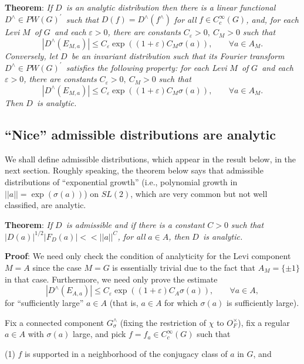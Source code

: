 \documentclass[11pt, a4paper]{article}
\begin{document}
{\bf Theorem}: {\em If }$D${\em \ is an analytic distribution then there is
a linear functional }$D^{\wedge }\in PW(G)^{\prime }${\em \ such that }%
$D(f)=D^{\wedge }(f^{\wedge })$ {\em for all }$f\in C_c^\infty (G)${\em ,
and, for each Levi }$M${\em \ of }$G${\em \ and each }$\varepsilon >0${\em ,
there are constants }$C_\varepsilon >0,\ C_M>0$ {\em such that}
\[
|D^{\wedge }(E_{M,a})|\leq C_\varepsilon \exp ((1+\varepsilon )C_M\sigma
(a)),\;\;\;\;\;\;\;\forall a\in A_M.
\]
{\em Conversely, let }$D${\em \ be an invariant distribution such that its
Fourier transform }$D^{\wedge }\in PW(G)^{\prime }${\em \ satisfies the
following property: for each Levi }$M${\em \ of }$G${\em \ and each }%
$\varepsilon >0${\em , there are constants }$C_\varepsilon >0,\ C_M>0$ {\em such
that}
\[
|D^{\wedge }(E_{M,a})|\leq C_\varepsilon \exp ((1+\varepsilon )C_M\sigma
(a)),\;\;\;\;\;\;\;\forall a\in A_M.
\]
{\em Then }$D${\em \ is analytic.}

\subsection{``Nice'' admissible distributions are analytic}

We shall define admissible distributions, which appear in the result below,
in the next section. Roughly speaking, the theorem below says that
admissible distributions of ``exponential growth'' (i.e., polynomial growth in $||a||=\exp (\sigma (a))$) on $SL(2)$, which are
very common but not well classified, are analytic.

{\bf Theorem}: {\em If }$D${\em \ is admissible and if there is a constant }$%
C>0$ {\em such that }$|D(a)|^{1/2}|F_D(a)|<<||a||^C${\em , for all }$a\in A${\em ,
then }$D${\em \ is analytic.}

{\bf Proof}: We need only check the condition of analyticity for the Levi
component $M=A$ since the case $M=G$ is essentially trivial due to the fact
that $A_M=\{\pm 1\}$ in that case. Furthermore, we need only prove the
estimate
\[
|D^{\wedge }(E_{A,a})|\leq C_\varepsilon \exp ((1+\varepsilon )C_A\sigma
(a)),\;\;\;\;\;\;\;\forall a\in A,
\]
for ``sufficiently large'' $a\in A$ (that is, $a\in A$ for which $\sigma (a)$
is sufficiently large).

Fix a connected component $G_\sigma ^{\wedge }$ (fixing the restriction of $\chi $ to $O_F^{\times }$), fix a regular $a\in A$ with $\sigma (a)$ large, and pick $f=f_a\in C_c^\infty (G)$ such that

(1) $f$ is supported in a neighborhood of the conjugacy class of $a$ in $G$,
and
\end{document}
